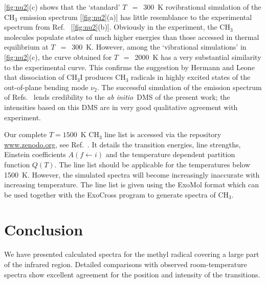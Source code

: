 \documentclass{achemso}
\newcommand{\red}[1]{{\color{red} #1}}
\newcommand{\3}{$_{3}$}
\newcommand{\abinitio}{\textit{ab initio}}
\begin{document}
\ref{fig:nu2}(c)   shows that the `standard'
 $T$~$=$~300~K rovibrational simulation of the CH$_3$ emission spectrum
[\ref{fig:nu2}(a)]
has little resemblance to
the experimental spectrum from
  Ref.~
[\ref{fig:nu2}(b)]. Obviously in the experiment, the CH$_3$ molecules populate states
of much higher energies than those accessed in thermal equilibrium at
 $T$~$=$~300~K. However, among the `vibrational simulations' in
\ref{fig:nu2}(c), the curve obtained for
 $T$~$=$~2000~K has a very substantial similarity to the experimental curve. This confirms the
suggestion by
Hermann and Leone\cite{nu2_82a,nu2_82b} that dissociation of
 CH$_3$I  produces
 CH$_3$ radicals in highly excited states of the out-of-plane bending mode $\nu_2$.
The successful simulation of the emission spectrum of
Refs.~ lends credibility to the
 \abinitio\ DMS of the present work; the
intensities based on
this DMS are in very good qualitative agreement with experiment.

Our complete $T=1500$~K CH$_3$ line list is accessed via the repository  \url{www.zenodo.org}, see Ref.~.
It details the transition energies, line strengths, Einstein
coefficients $A(f \leftarrow i)$ and the temperature dependent partition function $Q(T)$. The line list should be applicable for the temperatures below 1500~K. However, the simulated spectra will become increasingly inaccurate with increasing temperature. The line list is given using the ExoMol format\cite{exomol} which can be used together with the ExoCross program\cite{exocross} to generate spectra of CH$_3$.

\section{Conclusion}

We have presented calculated spectra for the methyl radical covering a large
part of the infrared region.
Detailed comparisons with observed room-temperature spectra show
excellent agreement for the position and intensity of the transitions.
\end{document}
